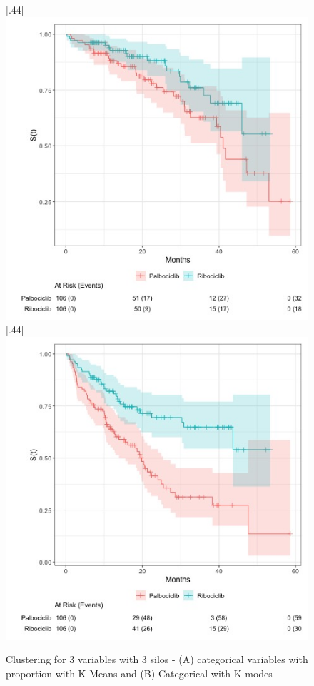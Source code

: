\begin{figure}[ht]
\caption{Clustering for 3 variables with 3 silos - (A) categorical variables with  proportion with K-Means and (B)  Categorical with K-modes  }\label{fig:prop_score} 
  [.44\linewidth]{%
    \includegraphics[width=\linewidth]{figures/propensity_score_os.jpg}%
  }%
  \hfill
  [.44\linewidth]{%
    \includegraphics[width=\linewidth]{figures/propensity_score_pfs.jpg}%
  }
\end{figure}


